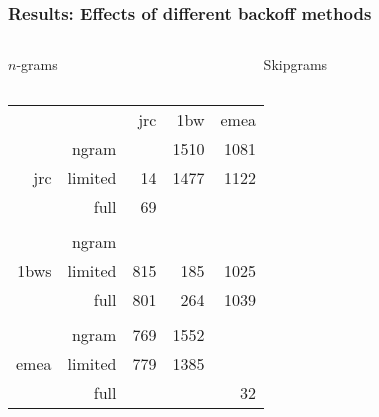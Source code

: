 \documentclass{beamer}
\begin{document}
\begin{frame}
    \frametitle{Results: Effects of different backoff methods}

    {\small
    \begin{columns}[totalwidth=\textwidth]
        \begin{column}{0.425\textwidth}
            \begin{block}{\hspace{2.55cm}$n$-grams}
            \end{block}
        \end{column}
        \begin{column}{0.425\textwidth}
            \begin{block}{Skipgrams}
            \end{block}
        \end{column}
    \end{columns}
    \begin{columns}[T,totalwidth=\textwidth]
        \begin{column}{0.425\textwidth}
                \begin{tabular}{rrrrr}
                                          &       & jrc & 1bw  & emea \\ \cline{3-5}
                    \multirow{3}{*}{jrc}  & ngram & \cellcolor{green!25}{13}  & 1510 & 1081 \\
                                          & limited& 14  & 1477 & 1122 \\
                                          & full   & 69  & \cellcolor{green!25}{1195} & \cellcolor{green!25}{961}  \\
         &&&& \\
                    \multirow{3}{*}{1bws} & ngram & \cellcolor{green!25}{768} & \cellcolor{green!25}{158}  & \cellcolor{green!25}{946}  \\
                                          & limited& 815 & 185  & 1025 \\
                                          & full   & 801 & 264  & 1039 \\ 
         &&&& \\ 
                    \multirow{3}{*}{emea} & ngram & 769 & 1552 & \cellcolor{green!25}{4}    \\   
                                          & limited& 779 & 1385 & \cellcolor{green!25}{4}    \\
                                          & full   & \cellcolor{green!25}{600} & \cellcolor{green!25}{1143} & 32

\end{tabular}
\end{column}
\end{columns}}
\end{frame}
\end{document}
